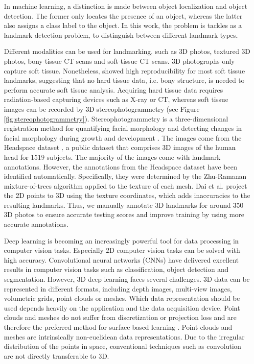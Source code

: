 In machine learning, a distinction is made between object localization and object detection. The former only locates the presence of an object, whereas the latter also assigns a class label to the object. In this work, the problem is tackles as a landmark detection problem, to distinguish between different landmark types.

Different modalities can be used for landmarking, such as 3D photos, textured 3D photos, bony-tissue CT scans and soft-tissue CT scans. 3D photographs only capture soft tissue. Nonetheless, \cite{Plooij2009} showed high reproducibility for most soft tissue landmarks, suggesting that no hard tissue data, i.e. bony structure, is needed to perform accurate soft tissue analysis. Acquiring hard tissue data requires radiation-based capturing devices such as X-ray or CT, whereas soft tissue images can be recorded by 3D stereophotogrammetry (see Figure \ref{fig:stereophotogrammetry}). Stereophotogrammetry is a three-dimensional registration method for quantifying facial morphology and detecting changes in facial morphology during growth and development \cite{Ras1996}.
The images come from the Headspace dataset \cite{Dai2019}, a public dataset that comprises 3D images of the human head for 1519 subjects. The majority of the images come with landmark annotations. However, the annotations from the Headspace dataset have been identified automatically. Specifically, they were determined by the Zhu-Ramanan mixture-of-trees algorithm \cite{Zhu2012} applied to the texture of each mesh. Dai et al. project the 2D points to 3D using the texture coordinates, which adds inaccuracies to the resulting landmarks. Thus, we manually annotate 3D landmarks for around 350 3D photos to ensure accurate testing scores and improve training by using more accurate annotations.

Deep learning is becoming an increasingly powerful tool for data processing in computer vision tasks. Especially 2D computer vision tasks can be solved with high accuracy. Convolutional neural networks (CNNs) have delivered excellent results in computer vision tasks such as classification, object detection and segmentation. However, 3D deep learning faces several challenges. 3D data can be represented in different formats, including depth images, multi-view images, volumetric grids, point clouds or meshes. Which data representation should be used depends heavily on the application and the data acquisition device. Point clouds and meshes do not suffer from discretization or projection loss and are therefore the preferred method for surface-based learning \cite{Guo2021}. Point clouds and meshes are intrinsically non-euclidean data representations. Due to the irregular distribution of the points in space, conventional techniques such as convolution are not directly transferable to 3D.

